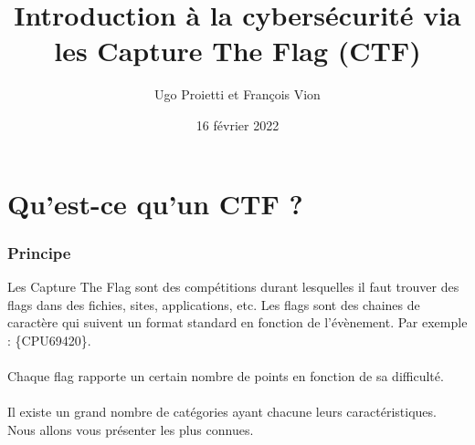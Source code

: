 \documentclass{beamer}
\title[Capture The Flag]{Introduction à la cybersécurité via les Capture The Flag (CTF)} %
\author{Ugo Proietti et François Vion} %
\institute[UMONS] %
{
Universtité de Mons \\ %
\medskip
}
\date[]{16 février 2022} %
\begin{document}
\begin{frame}
\titlepage %
\end{frame}

\begin{frame}
\frametitle{} %
\tableofcontents %
\end{frame}


\section{Qu'est-ce qu'un CTF ?} %

\begin{frame}
\frametitle{Principe}

Les Capture The Flag sont des compétitions durant lesquelles il faut trouver des flags dans des fichies, sites, applications, etc. Les flags sont des chaines de caractère qui suivent un format standard en fonction de l'évènement. Par exemple : \{CPU69420\}. \\~\\

Chaque flag rapporte un certain nombre de points en fonction de sa difficulté. \\~\\

Il existe un grand nombre de catégories ayant chacune leurs caractéristiques. Nous allons vous présenter les plus connues.

\end{frame}

\end{document}
